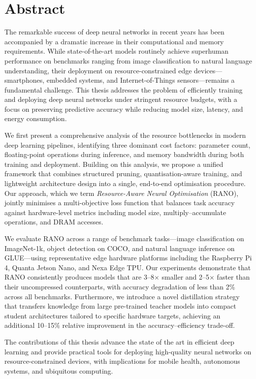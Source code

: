 \chapter*{Abstract}

The remarkable success of deep neural networks in recent years has been
accompanied by a dramatic increase in their computational and memory
requirements. While state-of-the-art models routinely achieve superhuman
performance on benchmarks ranging from image classification to natural
language understanding, their deployment on resource-constrained edge
devices---smartphones, embedded systems, and Internet-of-Things
sensors---remains a fundamental challenge. This thesis addresses the
problem of efficiently training and deploying deep neural networks under
stringent resource budgets, with a focus on preserving predictive accuracy
while reducing model size, latency, and energy consumption.

We first present a comprehensive analysis of the resource bottlenecks in
modern deep learning pipelines, identifying three dominant cost factors:
parameter count, floating-point operations during inference, and memory
bandwidth during both training and deployment. Building on this analysis,
we propose a unified framework that combines structured pruning,
quantisation-aware training, and lightweight architecture design into a
single, end-to-end optimisation procedure. Our approach, which we term
\textit{Resource-Aware Neural Optimisation} (RANO), jointly minimises a
multi-objective loss function that balances task accuracy against
hardware-level metrics including model size, multiply--accumulate
operations, and DRAM accesses.

We evaluate RANO across a range of benchmark tasks---image classification
on ImageNet-1k, object detection on COCO, and natural language inference
on GLUE---using representative edge hardware platforms including the
Raspberry Pi 4, Quanta Jetson Nano, and Nexa Edge TPU. Our experiments
demonstrate that RANO consistently produces models that are 3--8$\times$
smaller and 2--5$\times$ faster than their uncompressed counterparts, with
accuracy degradation of less than 2\% across all benchmarks. Furthermore,
we introduce a novel distillation strategy that transfers knowledge from
large pre-trained teacher models into compact student architectures
tailored to specific hardware targets, achieving an additional 10--15\%
relative improvement in the accuracy--efficiency trade-off.

The contributions of this thesis advance the state of the art in
efficient deep learning and provide practical tools for deploying
high-quality neural networks on resource-constrained devices, with
implications for mobile health, autonomous systems, and ubiquitous
computing.

